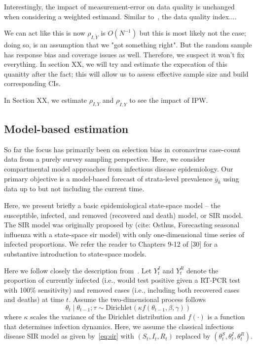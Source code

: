 \documentclass[11pt]{amsart}
\begin{document}
Interestingly, the impact of measurement-error on data quality is unchanged when considering a weighted estimand.  Similar to~\cite{Meng2018}, the data quality index....

We can act like this is now $\rho_{I,\tilde Y}$ is $O(N^{-1})$ but this is most likely not the case; doing so, is an assumption that we "got something right".  But the random sample has response bias and coverage issues as well.  Therefore, we suspect it won't fix everything.  In section XX, we will try and estimate the expecation of this quanitty after the fact; this will allow us to assess effective sample size and build corresponding CIs.

In Section XX, we estimate $\rho_{I,Y}$ and $\rho_{\tilde I, Y}$ to see the impact of IPW.

\subsection{Model-based estimation}
\label{section:modelbased}

So far the focus has primarily been on selection bias in coronavirus case-count data from a purely survey sampling perspective.  Here, we consider  compartmental model approaches from infectious disease epidemiology.  Our primary objective is a model-based forecast of strata-level prevalence $\bar y_k$ using data up to but not including the current time.

Here, we present briefly a basic epidemiological state-space model -- the susceptible, infected, and removed (recovered and death) model, or SIR model. The SIR model was originally proposed by (cite: Osthus, Forecasting seasonal influenza with a state-space sir model) with only one-dimensional time series of infected proportions. We refer the reader to Chapters 9-12 of [30] for a substantive introduction to state-space models.

Here we follow closely the description from~\cite{Song2020}. Let $Y_t^I$ and $Y_t^R$ denote the proportion of currently infected (i.e., would test positive given a RT-PCR test with 100\% sensitivity) and removed cases (i.e., including both recovered cases and deaths) at time $t$.  Assume the two-dimensional process follows
$$
\theta_t \mid \theta_{t-1}; \tau \sim \text{Dirichlet} \left(\kappa f(\theta_{t-1}, \beta, \gamma) \right)
$$
where $\kappa$ scales the variance of the Dirichlet distribution and $f(\cdot)$ is a function that determines infection dynamics.  Here, we assume the classical infectious disease SIR model as given by~\eqref{eq:sir} with $(S_t,I_t, R_t)$ replaced by $(\theta_t^S, \theta_t^I, \theta_t^R)$.  \cite{Song2020}
\end{document}
